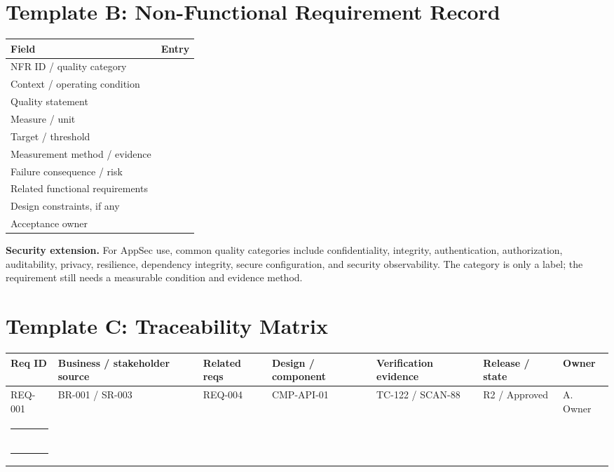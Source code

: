 \documentclass[11pt]{article}
\begin{document}
\section{Template B: Non-Functional Requirement Record}
\begin{longtable}{L{0.25\textwidth} L{0.63\textwidth}}
\toprule
Field & Entry\\
\midrule
NFR ID / quality category & \vspace{0.18in}\\
Context / operating condition & \vspace{0.22in}\\
Quality statement & \vspace{0.30in}\\
Measure / unit & \vspace{0.18in}\\
Target / threshold & \vspace{0.18in}\\
Measurement method / evidence & \vspace{0.25in}\\
Failure consequence / risk & \vspace{0.24in}\\
Related functional requirements & \vspace{0.18in}\\
Design constraints, if any & \vspace{0.20in}\\
Acceptance owner & \vspace{0.18in}\\
\bottomrule
\end{longtable}

\begin{practicebox}
\textbf{Security extension.} For AppSec use, common quality categories include confidentiality, integrity, authentication, authorization, auditability, privacy, resilience, dependency integrity, secure configuration, and security observability. The category is only a label; the requirement still needs a measurable condition and evidence method.
\end{practicebox}
\section{Template C: Traceability Matrix}
\small
\begin{longtable}{L{0.10\textwidth} L{0.13\textwidth} L{0.13\textwidth} L{0.14\textwidth} L{0.14\textwidth} L{0.12\textwidth} L{0.08\textwidth}}
\toprule
Req ID & Business / stakeholder source & Related reqs & Design / component & Verification evidence & Release / state & Owner\\
\midrule
REQ-001 & BR-001 / SR-003 & REQ-004 & CMP-API-01 & TC-122 / SCAN-88 & R2 / Approved & A. Owner\\
\rule{0.8in}{0.4pt} & & & & & & \\
\rule{0.8in}{0.4pt} & & & & & & \\
\bottomrule
\end{longtable}
\normalsize
\end{document}
